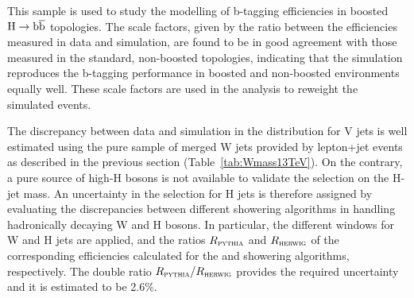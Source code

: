 This sample is used to study the modelling of b-tagging efficiencies in boosted $\mathrm{H}\to{\mathrm{b}\overline{\mathrm{b}}}$ topologies.
The scale factors, given by the ratio between the efficiencies measured in data and simulation, are
found to be in good agreement with those measured in the standard, non-boosted topologies,
indicating that the simulation reproduces the b-tagging performance in boosted and non-boosted environments equally well.
These scale factors are used in the analysis to reweight the simulated events.

The discrepancy between data and simulation in the \mJ distribution for V jets is well estimated 
using the pure sample of merged W jets provided by lepton+jet \ttbar events as described in the previous section (Table~\ref{tab:Wmass13TeV}).
On the contrary, a pure source of high-\pt H bosons is not available to validate the selection on the H-jet mass.
An uncertainty in the \mJ selection for H jets is therefore assigned by evaluating the discrepancies
between different showering algorithms in handling hadronically decaying W and H bosons.
In particular, the different \mJ windows for W and H jets are applied,
and the ratios $R_{\textsc{pythia}}{}$ and $R_{\textsc{herwig}}{}$ of the corresponding efficiencies calculated for the \PYTHIA{} and \HERWIG{} showering algorithms, respectively.
The double ratio $R_{\textsc{pythia}}{}/R_{\textsc{herwig}}{}$ provides the required uncertainty and it is estimated to be 2.6\%.

